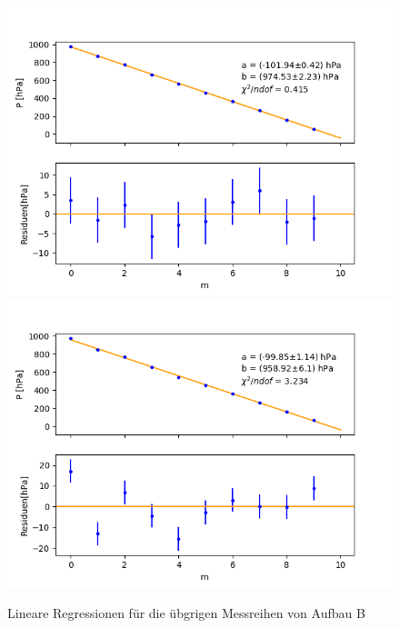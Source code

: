 \documentclass[12pt,a4paper]{article}
\begin{document}
\begin{figure}
\includegraphics[scale=0.5]{Bilder/Druck_A_Var2_5.png}
\includegraphics[scale=0.5]{Bilder/Druck_A_Var2_6.png}
\caption{Lineare Regressionen für die übgrigen Messreihen von Aufbau B}
\end{figure}
\end{document}
